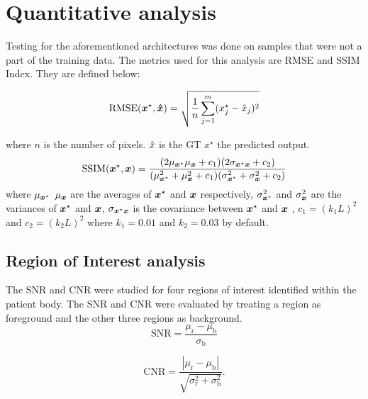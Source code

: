 \section{Quantitative analysis}
Testing for the aforementioned architectures was done on samples that were not a part of the training data. The metrics used for this analysis are \ac{RMSE} and \ac{SSIM} Index. They are defined below:

\begin{equation}
\mathrm{RMSE}(\bm{x}^\star,\bm{\hat{x}}) = \sqrt{\frac{1}{n}   \sum_{j=1}^{m} (x^\star_j-\hat{x}_j )^2} 
\end{equation}

where $n$ is the number of pixels. $\hat{x}$ is the \ac{GT} $x^\star$ the predicted output. \\
\begin{equation}
\mathrm{SSIM}(\bm{x}^\star,\bm{x}) = \frac{(2\mu_{\bm{x}^\star}\mu_{\bm{x}}+c_{1})(2\sigma_{\bm{x}^\star\bm{x}}+c_{2})}{(\mu_{\bm{x}^\star}^2+\mu_{\bm{x}}^2+c_{1})(\sigma_{\bm{x}^\star}^2+\sigma_{\bm{x}}^2+c_{2})}   
\end{equation}
where $\mu_{\bm{x}^\star}$ $\mu_{\bm{x}}$ are the averages of $\bm{x}^\star$ and $\bm{x}$ respectively, $\sigma_{\bm{x}^\star}^2$ and $\sigma_{\bm{x}}^2$ are the variances of $\bm{x}^\star$ and $\bm{x}$, $\sigma_{\bm{x}^\star\bm{x}}$ is the covariance between $\bm{x}^\star$ and $\bm{x}$ , $c_{1}=(k_{1}L)^2$ and $c_{2}=(k_{2}L)^2$ where $k_{1}=0.01$ and $k_{2}=0.03$ by default. 
\subsection{Region of Interest analysis}

The \ac{SNR} and \ac{CNR} were studied for four regions of interest identified within the patient body. The \ac{SNR} and \ac{CNR} were evaluated by treating a region as foreground and the other three regions as background. 
\begin{equation}
\mathrm{SNR} = \frac{\mu_\mathrm{r}-\mu_\mathrm{b}}{\sigma_\mathrm{b}}
\label{SNR}
\end{equation}

\begin{equation}
\mathrm{CNR} = \frac{|{\mu_\mathrm{r}-\mu_\mathrm{b}}|}{\sqrt{\sigma_\mathrm{r}^2+\sigma_\mathrm{b}^2}}.
\label{CNR}
\end{equation}

